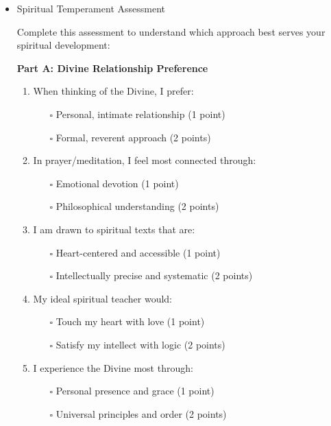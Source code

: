 \documentclass[11pt,twoside]{book}
\begin{document}
\begin{itemize}
\item Spiritual Temperament Assessment
\label{sec:org4d4c002}

Complete this assessment to understand which approach best serves your spiritual development:

\textbf{\textbf{Part A: Divine Relationship Preference}}

\begin{enumerate}
\item When thinking of the Divine, I prefer:
\begin{itemize}
\item[{$\square$}] Personal, intimate relationship (1 point)
\item[{$\square$}] Formal, reverent approach (2 points)
\end{itemize}

\item In prayer/meditation, I feel most connected through:
\begin{itemize}
\item[{$\square$}] Emotional devotion (1 point)
\item[{$\square$}] Philosophical understanding (2 points)
\end{itemize}

\item I am drawn to spiritual texts that are:
\begin{itemize}
\item[{$\square$}] Heart-centered and accessible (1 point)
\item[{$\square$}] Intellectually precise and systematic (2 points)
\end{itemize}

\item My ideal spiritual teacher would:
\begin{itemize}
\item[{$\square$}] Touch my heart with love (1 point)
\item[{$\square$}] Satisfy my intellect with logic (2 points)
\end{itemize}

\item I experience the Divine most through:
\begin{itemize}
\item[{$\square$}] Personal presence and grace (1 point)
\item[{$\square$}] Universal principles and order (2 points)
\end{itemize}
\end{enumerate}


\end{itemize}
\end{document}
